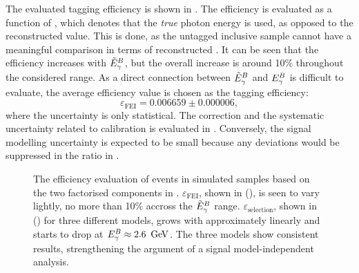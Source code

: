The evaluated tagging efficiency is shown in .
The efficiency is evaluated as a function of \EtildeB, which denotes that the \textit{true} photon energy is used, 
as opposed to the reconstructed value.
This is done, as the untagged inclusive sample cannot have a meaningful comparison in terms of reconstructed \EB.
It can be seen that the efficiency increases with ${\tilde{E}_{\gamma}^B}$, but the overall increase is around 10\% throughout the considered range.
As a direct connection between ${\tilde{E}_{\gamma}^B}$ and ${E^B_{\gamma}}$ is difficult to evaluate, the average efficiency value is chosen as the tagging efficiency:
\begin{equation}\label{eq:avg_efficiency_fei}
    \varepsilon_{\mathrm{FEI}} = 0.006659 \pm 0.000006,
\end{equation}
where the uncertainty is only statistical.
The correction and the systematic uncertainty related to \FEI calibration is evaluated in .
Conversely, the signal modelling uncertainty is expected to be small because any deviations would be suppressed in the ratio in .
\begin{figure}[hbtp!]
    \centering
    \caption{\label{fig:epsilon} The efficiency evaluation of \BtoXsgamma events in simulated samples based on the two factorised components in
    .
    $\varepsilon_{\mathrm{FEI}}$, shown in (), is seen to vary lightly, no more than 10\% accross the ${\tilde{E}_{\gamma}^B}$ range.
    $\varepsilon_{\mathrm{selection}}$, shown in () for three different models,
    grows with \EB approximately linearly and starts to drop at ${E^B_{\gamma}}\approx2.6~\mathrm{\,Ge\kern -0.1em V}$.
    The three models show consistent results, strengthening the argument of a signal model-independent analysis.
    }
\end{figure}

